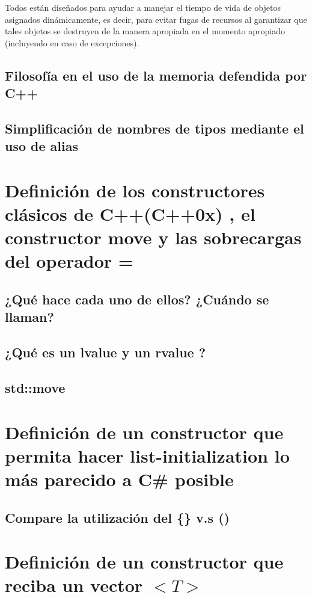 \documentclass[10pt]{article}
\begin{document}
Todos están diseñados para ayudar a manejar el tiempo de vida de objetos asignados dinámicamente, es decir, para evitar fugas de recursos al garantizar que tales objetos se destruyen de la manera apropiada en el momento apropiado (incluyendo en caso de excepciones).

\subsection{Filosofía en el uso de la memoria defendida por C++}

\subsection{Simplificaci\'on de nombres de tipos mediante el uso de alias}

\vspace{2em}
\section{Definici\'on de  los constructores clásicos de C++(C++0x) , el constructor move y las sobrecargas del operador =}

\subsection{¿Qué hace cada uno de ellos? ¿Cuándo se llaman?}

\subsection{¿Qué es un lvalue y un rvalue ?}

\subsection{std::move}

\newpage
\section{Definici\'on de un constructor que permita hacer list-initialization lo más parecido a C\# posible}

\subsection{Compare la utilización del \{\} v.s ()}

\newpage
\section{Definici\'on de  un constructor que reciba un vector $ <T> $}
\end{document}
